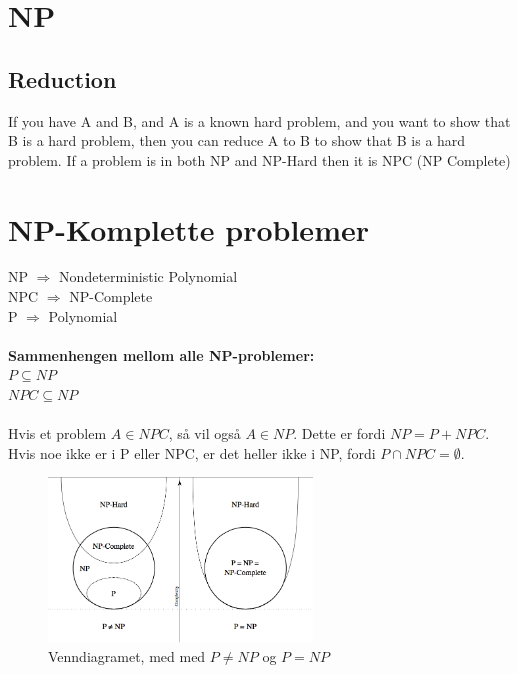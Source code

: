 \documentclass[a4paper, 10pt]{article}
\begin{document}
\begin{algorithmic}
\begin{algoritmic}
\section{NP}
\subsection{Reduction}
If you have A and B, and A is a known hard problem, and you want to show that B is a hard problem, then you can reduce A to B to show that B is a hard problem.
If a problem is in both NP and NP-Hard then it is NPC (NP Complete)

\section{NP-Komplette problemer}

\noindent NP $\Rightarrow$ Nondeterministic Polynomial \\
\noindent NPC $\Rightarrow$ NP-Complete\\
\noindent P $\Rightarrow$ Polynomial \\ \\

\noindent \textbf{Sammenhengen mellom alle NP-problemer:} \\

$P \subseteq NP$ \\
$NPC \subseteq NP$ \\ \\

\noindent Hvis et problem $A \in NPC$, så vil også $A \in NP$. Dette er fordi $NP = P + NPC$. Hvis noe ikke er i P eller NPC, er det heller ikke i NP, fordi $P \cap NPC = \emptyset$. \\ \hfill
\begin{figure}[hbt]
    \begin{center}
        \includegraphics[width=7cm] {npc.png}
        \caption{Venndiagramet, med med $P \neq NP$ og $P = NP$}
    \end{center}
\end{figure}


\end{algoritmic}
\end{algorithmic}
\end{document}
